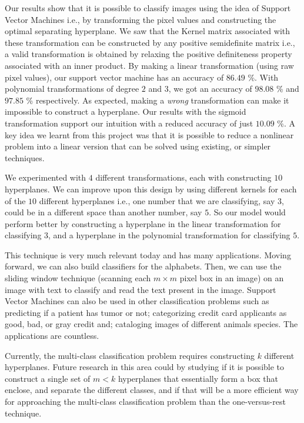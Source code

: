 Our results show that it is possible to classify images using the idea of Support Vector Machines i.e., by transforming the pixel values and constructing the optimal separating hyperplane. We saw that the Kernel matrix associated with these transformation can be constructed by any positive semidefinite matrix i.e., a valid transformation is obtained by relaxing the positive definiteness property associated with an inner product. By making a linear transformation (using raw pixel values), our support vector machine has an accuracy of $86.49$ \%. With polynomial transformations of degree $2$ and $3$, we got an accuracy of $98.08$ \% and $97.85$ \% respectively. As expected, making a \textit{wrong} transformation can make it impossible to construct a hyperplane. Our results with the sigmoid transformation support our intuition with a reduced accuracy of just $10.09$ \%. A key idea we learnt from this project was that it is possible to reduce a nonlinear problem into a linear version that can be solved using existing, or simpler techniques. 

We experimented with $4$ different transformations, each with constructing $10$ hyperplanes. We can improve upon this design by using different kernels for each of the $10$ different hyperplanes i.e., one number that we are classifying, say $3$, could be in a different space than another number, say $5$. So our model would perform better by constructing a hyperplane in the linear transformation for classifying $3$, and a hyperplane in the polynomial transformation for classifying $5$.

This technique is very much relevant today and has many applications. Moving forward, we can also build classifiers for the alphabets. Then, we can use the sliding window technique (scanning each $m\times m$ pixel box in an image) on an image with text to classify and read the text present in the image. Support Vector Machines can also be used in other classification problems such as predicting if a patient has tumor or not; categorizing credit card applicants as good, bad, or gray credit and; cataloging images of different animals species. The applications are countless.

Currently, the multi-class classification problem requires constructing $k$ different hyperplanes. Future research in this area could by studying if it is possible to construct a single set of $m < k$ hyperplanes that essentially form a box that enclose, and separate the different classes, and if that will be a more efficient way for approaching the multi-class classification problem than the one-versus-rest technique.